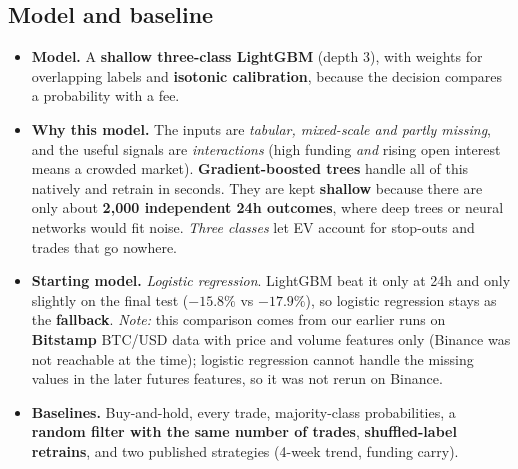 \documentclass[10pt,a4paper]{article}
\begin{document}
\subsection{Model and baseline}
\begin{itemize}
  \item \textbf{Model.} A \textbf{shallow three-class LightGBM} (depth 3), with weights for overlapping labels and
        \textbf{isotonic calibration}, because the decision compares a probability with a fee.
  \item \textbf{Why this model.} The inputs are \emph{tabular, mixed-scale and partly missing}, and the useful signals are
        \emph{interactions} (high funding \emph{and} rising open interest means a crowded market). \textbf{Gradient-boosted trees}
        handle all of this natively and retrain in seconds. They are kept \textbf{shallow} because there are only about
        \textbf{2,000 independent 24h outcomes}, where deep trees or neural networks would fit noise. \emph{Three classes} let EV
        account for stop-outs and trades that go nowhere.
  \item \textbf{Starting model.} \emph{Logistic regression}. LightGBM beat it only at 24h and only slightly on the
        final test ($-15.8\%$ vs $-17.9\%$), so logistic regression stays as the \textbf{fallback}. \emph{Note:} this comparison
        comes from our earlier runs on \textbf{Bitstamp} BTC/USD data with price and volume features only (Binance was not reachable
        at the time); logistic regression cannot handle the missing values in the later futures features, so it was not rerun on Binance.
  \item \textbf{Baselines.} Buy-and-hold, every trade, majority-class probabilities, a \textbf{random filter with the same number of
        trades}, \textbf{shuffled-label retrains}, and two published strategies (4-week trend, funding carry).
\end{itemize}
\end{document}
